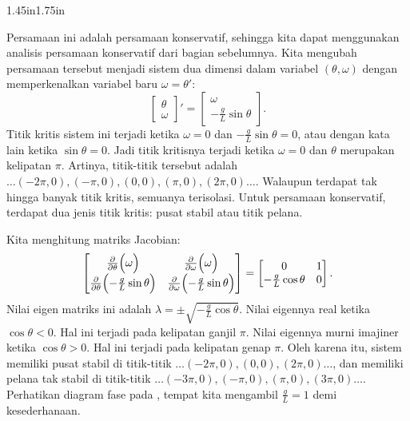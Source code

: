 \begin{mywrapfigsimp}{1.45in}{1.75in}
\noindent
{}
\end{mywrapfigsimp}
Persamaan ini adalah persamaan konservatif, sehingga kita dapat menggunakan
analisis persamaan konservatif dari bagian sebelumnya.
Kita mengubah persamaan tersebut menjadi sistem dua dimensi
dalam variabel $(\theta,\omega)$ dengan memperkenalkan variabel baru
$\omega = \theta'$:
\begin{equation*}
\begin{bmatrix}
\theta \\ \omega
\end{bmatrix} '
=
\begin{bmatrix}
\omega \\
- \frac{g}{L} \sin \theta
\end{bmatrix} .
\end{equation*}
Titik kritis sistem ini terjadi ketika $\omega = 0$ dan $-\frac{g}{L}
\sin \theta = 0$, atau dengan kata lain ketika $\sin \theta = 0$. Jadi titik
kritisnya terjadi ketika $\omega = 0$ dan $\theta$ merupakan kelipatan
$\pi$. Artinya, titik-titik tersebut adalah $\ldots (-2\pi,0), (-\pi,0),
(0,0), (\pi,0), (2\pi,0) \ldots$. Walaupun terdapat tak hingga banyak titik
kritis, semuanya terisolasi. Untuk persamaan konservatif, terdapat dua jenis
titik kritis: pusat stabil atau titik pelana.

Kita menghitung matriks Jacobian:
\begin{equation*}
\begin{bmatrix}
\frac{\partial}{\partial \theta} \Bigl( \omega \Bigr) & 
\frac{\partial}{\partial \omega} \Bigl( \omega \Bigr) \\
\frac{\partial}{\partial \theta} \Bigl( - \frac{g}{L} \sin \theta \Bigr) & 
\frac{\partial}{\partial \omega} \Bigl( - \frac{g}{L} \sin \theta \Bigr)
\end{bmatrix}
=
\begin{bmatrix}
0 & 1 \\
- \frac{g}{L} \cos \theta & 0
\end{bmatrix} .
\end{equation*}
Nilai eigen matriks ini adalah
$\lambda = \pm \sqrt{-\frac{g}{L}\cos \theta}$.
Nilai eigennya real ketika $\cos \theta < 0$. Hal ini terjadi pada
kelipatan ganjil $\pi$. Nilai eigennya murni imajiner ketika
$\cos \theta > 0$. Hal ini terjadi pada kelipatan genap $\pi$. Oleh karena
itu, sistem memiliki pusat stabil di titik-titik $\ldots (-2\pi,0), (0,0),
(2\pi,0) \ldots$, dan memiliki pelana tak stabil di titik-titik
$\ldots (-3\pi,0), (-\pi,0), (\pi,0), (3\pi,0) \ldots$. Perhatikan diagram
fase pada , tempat kita mengambil
$\frac{g}{L} = 1$ demi kesederhanaan.

